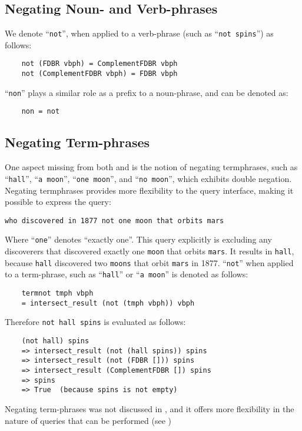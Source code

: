\documentclass[../main.tex]{subfiles}
\begin{document}
\begin{refsection}
\subsection{Negating Noun- and Verb-phrases}

We denote ``\texttt{not}'', when applied to a verb-phrase (such as ``\texttt{not spins}'') as follows:
\begin{small}
	\begin{verbatim}
    not (FDBR vbph) = ComplementFDBR vbph
    not (ComplementFDBR vbph) = FDBR vbph
	\end{verbatim}
\end{small}
``\texttt{non}'' plays a similar role as a prefix to a noun-phrase, and can be denoted as:
\begin{small}
	\begin{verbatim}
    non = not
	\end{verbatim}
\end{small}

\subsection{Negating Term-phrases}

One aspect missing from both \cite{ferre2014squall} and \cite{frostboulos2002} is the notion
of negating termphrases, such as ``\texttt{hall}'', ``\texttt{a moon}'', ``\texttt{one moon}'', and ``\texttt{no moon}'', which exhibits double negation.  Negating termphrases provides more flexibility to the query interface, making it possible to express the query:

\begin{center}
	\texttt{who discovered in 1877 not one moon that orbits mars}
\end{center}
Where ``\texttt{one}'' denotes ``exactly one''.  This query explicitly is excluding any discoverers that discovered exactly one \texttt{moon} that orbits \texttt{mars}.  It results in \texttt{hall}, because \texttt{hall} discovered two \texttt{moons} that orbit \texttt{mars} in 1877.
``\texttt{not}'' when applied to a term-phrase, such as ``\texttt{hall}'' or ``\texttt{a moon}'' is denoted as follows:
\begin{small}
	\begin{verbatim}
    termnot tmph vbph
    = intersect_result (not (tmph vbph)) vbph
	\end{verbatim}
\end{small}
Therefore \texttt{not hall spins} is evaluated as follows:
\begin{small}
	\begin{verbatim}
    (not hall) spins
    => intersect_result (not (hall spins)) spins
    => intersect_result (not (FDBR [])) spins
    => intersect_result (ComplementFDBR []) spins
    => spins
    => True  (because spins is not empty)
	\end{verbatim}
\end{small}
Negating term-phrases was not discussed in \cite{frostboulos2002}, and it offers more flexibility
in the nature of queries that can be performed (see )



\end{refsection}
\end{document}
